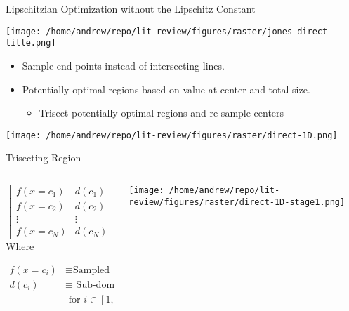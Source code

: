 \documentclass[presentation, aspectratio=1610]{beamer}
\begin{document}
\begin{frame}[label={sec:org9bc9654}]{Lipschitzian Optimization without the Lipschitz Constant}
\begin{center}
\texttt{[image: /home/andrew/repo/lit-review/figures/raster/jones-direct-title.png]}
\end{center}
\begin{itemize}
\item Sample end-points instead of intersecting lines.
\item Potentially optimal regions based on value at center and total size.
\begin{itemize}
\item Trisect potentially optimal regions and re-sample centers
\end{itemize}
\end{itemize}
\begin{center}
\texttt{[image: /home/andrew/repo/lit-review/figures/raster/direct-1D.png]}
\end{center}
\end{frame}
\begin{frame}[label={sec:orgb0eb13b}]{Trisecting Region}
\begin{columns}
\begin{column}{0.4\columnwidth}
\begin{equation*}
  \begin{bmatrix}
    f(x=c_{1}) & d(c_{1})\\
    f(x=c_{2}) & d(c_{2})\\
    \vdots & \vdots \\
    f(x=c_{N}) & d(c_{N})
  \end{bmatrix}
\end{equation*}
Where

\begin{align*}
  f(x=c_{i}) &\equiv \text{Sampled function value} \\
  d(c_{i}) & \equiv \text{ Sub-domain size } \\
  & \text{ for } i \in [1,N]
\end{align*}
\end{column}

\begin{column}{0.6\columnwidth}
\begin{center}
\texttt{[image: /home/andrew/repo/lit-review/figures/raster/direct-1D-stage1.png]}
\end{center}
\end{column}
\end{columns}
\end{frame}
\end{document}
